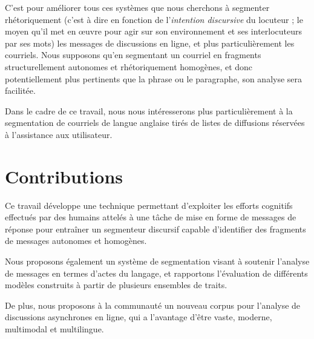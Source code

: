 C'est pour améliorer tous ces systèmes que nous cherchons à segmenter rhétoriquement (c'est à dire en fonction de l'\textit{intention discursive} du locuteur ; le moyen qu'il met en œuvre pour agir sur son environnement et ses interlocuteurs par ses mots) les messages de discussions en ligne, et plus particulièrement les courriels. Nous supposons qu'en segmentant un courriel en fragments structurellement autonomes et rhétoriquement homogènes, et donc potentiellement plus pertinents que la phrase ou le paragraphe, son analyse sera facilitée.

Dans le cadre de ce travail, nous nous intéresserons plus particulièrement à la segmentation de courriels de langue anglaise tirés de listes de diffusions réservées à l'assistance aux utilisateur.

\section{Contributions}

Ce travail développe une technique permettant d'exploiter les efforts cognitifs effectués par des humains attelés à une tâche de mise en forme de messages de réponse pour entraîner un segmenteur discursif capable d'identifier des fragments de messages autonomes et homogènes.

Nous proposons également un système de segmentation visant à soutenir l'analyse de messages en termes d'actes du langage, et rapportons l'évaluation de différents modèles construits à partir de plusieurs ensembles de traits.

De plus, nous proposons à la communauté un nouveau corpus pour l'analyse de discussions asynchrones en ligne, qui a l'avantage d'être vaste, moderne, multimodal et multilingue.